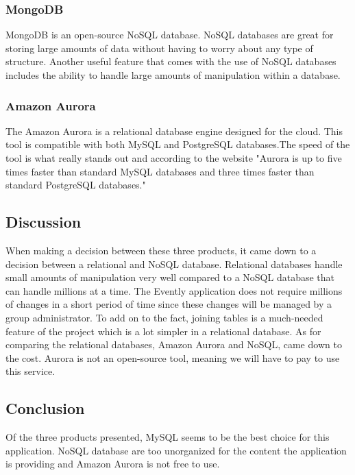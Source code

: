 \documentclass[onecolumn, draftclsnofoot,10pt, compsoc]{IEEEtran}
\begin{document}
\subsubsection{MongoDB}

MongoDB is an open-source NoSQL database. NoSQL databases are great for storing large amounts of data without having to worry about any type of structure. Another useful feature that comes with the use of NoSQL databases includes the ability to handle large amounts of manipulation within a database.

\subsubsection{Amazon Aurora}

The Amazon Aurora is a relational database engine designed for the cloud. This tool is compatible with both MySQL and PostgreSQL databases.The speed of the tool is what really stands out and according to the website "Aurora is up to five times faster than standard MySQL databases and three times faster than standard PostgreSQL databases."

\subsection{Discussion}

When making a decision between these three products, it came down to a decision between a relational and NoSQL database. Relational databases handle small amounts of manipulation very well compared to a NoSQL database that can handle millions at a time. The Evently application does not require millions of changes in a short period of time since these changes will be managed by a group administrator. To add on to the fact, joining tables is a much-needed feature of the project which is a lot simpler in a relational database. As for comparing the relational databases, Amazon Aurora and NoSQL, came down to the cost. Aurora is not an open-source tool, meaning we will have to pay to use this service.

\subsection{Conclusion}

Of the three products presented, MySQL seems to be the best choice for this application. NoSQL database are too unorganized for the content the application is providing and Amazon Aurora is not free to use. 
\end{document}
